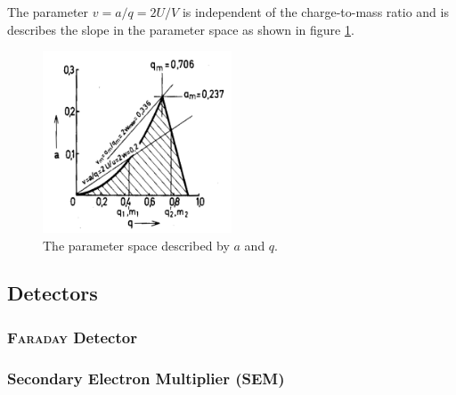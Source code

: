     The parameter $v=a/q=2U/V$ is independent of the charge-to-mass ratio and is describes the slope in the parameter space as shown in figure \ref{fig:paramspace}.
    \begin{figure}[h!]
    \centering
    \includegraphics[width=0.5\textwidth]{Report/pictures/paramspace.png}
    \caption{The parameter space described by $a$ and $q$. \cite{manual}}
    \label{fig:paramspace}
    \end{figure}
    
    
    
    \subsection{Detectors}
    \subsubsection{{\scshape Faraday} Detector}
    
    \subsubsection{Secondary Electron Multiplier (SEM)}